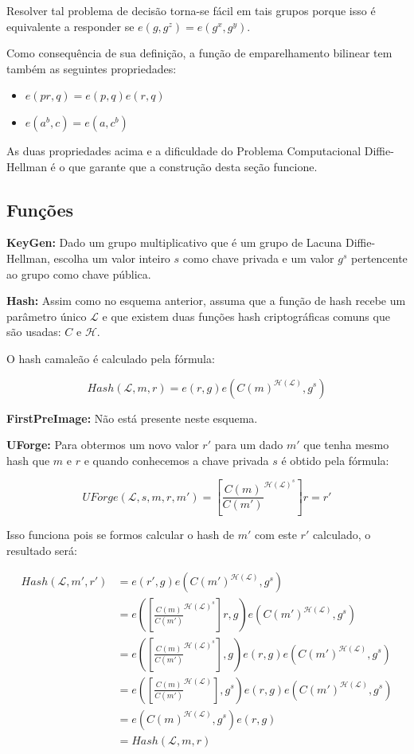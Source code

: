\documentclass[a4paper]{article}
\begin{document}
Resolver tal problema de decisão torna-se fácil em tais grupos porque
isso é equivalente a responder se $e(g, g^z) = e(g^x, g^y)$.

Como consequência de sua definição, a função de emparelhamento
bilinear tem também as seguintes propriedades:

\begin{itemize}
\item$e(pr, q) = e(p, q)e(r, q)$
\item$e(a^b, c) = e(a, c^b)$
\end{itemize}

As duas propriedades acima e a dificuldade do Problema Computacional
Diffie-Hellman é o que garante que a construção desta seção funcione.

\subsection{Funções}

\textbf{KeyGen: }Dado um grupo multiplicativo que é um grupo de Lacuna
Diffie-Hellman, escolha um valor inteiro $s$ como chave privada e um
valor $g^s$ pertencente ao grupo como chave pública.

\textbf{Hash: } Assim como no esquema anterior, assuma que a função de
hash recebe um parâmetro único $\mathcal{L}$ e que existem duas
funções hash criptográficas comuns que são usadas: $C$ e
$\mathcal{H}$.

O hash camaleão é calculado  pela fórmula:

$$
Hash(\mathcal{L}, m, r) = e(r, g)e(C(m)^{\mathcal{H}(\mathcal{L})}, g^s)
$$

\textbf{FirstPreImage:} Não está presente neste esquema.

\textbf{UForge:} Para obtermos um novo valor $r'$ para um dado $m'$
que tenha mesmo hash que $m$ e $r$ e quando conhecemos a chave privada
$s$ é obtido pela fórmula:

$$
UForge(\mathcal{L}, s, m, r, m') = \left[\frac{C(m)}{C(m')}^{\mathcal{H}(\mathcal{L})^s}\right]r = r'
$$

Isso funciona pois se formos calcular o hash de $m'$ com este $r'$
calculado, o resultado será:

\begin{equation}
\begin{split}
  Hash(\mathcal{L}, m', r') &= e(r', g)e(C(m')^{\mathcal{H}(\mathcal{L})}, g^s)\\
  &= e(\left[\frac{C(m)}{C(m')}^{\mathcal{H}(\mathcal{L})^s}\right]r, g)e(C(m')^{\mathcal{H}(\mathcal{L})}, g^s)\\
  &=e(\left[\frac{C(m)}{C(m')}^{\mathcal{H}(\mathcal{L})^s}\right], g)e(r, g)e(C(m')^{\mathcal{H}(\mathcal{L})}, g^s)\\
  &=e(\left[\frac{C(m)}{C(m')}^{\mathcal{H}(\mathcal{L})}\right], g^s)e(r, g)e(C(m')^{\mathcal{H}(\mathcal{L})}, g^s)\\
  &=e(C(m)^{\mathcal{H}(\mathcal{L})}, g^s)e(r, g)\\
  &= Hash(\mathcal{L}, m, r)\\
\end{split}
\end{equation}
\end{document}
